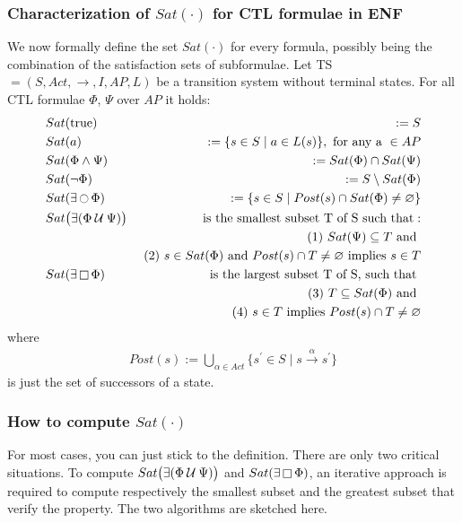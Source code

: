 \documentclass{article}
\begin{document}
\subsubsection*{Characterization of $Sat(\cdot)$ for CTL formulae in ENF}
We now formally define the set $Sat(\cdot)$ for every formula, 
possibly being the combination of the satisfaction sets of subformulae. 
Let TS $ = (S, Act, \rightarrow, I, AP, L)$ be a transition system without terminal states. 
For all CTL formulae $\Phi$, $\Psi$ over $AP$ it holds:
\begin{eqnarray*}
    & Sat(\text{true})          & := S \\
    & Sat(a)                    & := \{ s \in S \mid a \in L(s) \}, \text{ for any a } \in AP \\ 
    & Sat( \Phi \land \Psi)     & := Sat(\Phi) \cap Sat(\Psi) \\ 
    & Sat(\neg \Phi)            & := S \setminus Sat(\Phi) \\ 
    & Sat(\exists \mathop{\ocircle}{\Phi}) & := \{ s \in S \mid Post(s) \cap Sat(\Phi) \neq \varnothing \}\\
    & Sat\big(\exists (\Phi \mathbin{\mathcal{U}} \Psi) \big) & \text{ is the smallest subset T of S such that}: \\
    && \text{ (1) } Sat(\Psi) \subseteq T \text{ and } \\
    && \text{ (2) } s \in Sat(\Phi) \text{ and } Post(s) \cap T \neq \varnothing \text{ implies } s \in T \\
    & Sat(\exists \mathop{\square} \Phi) & \text{is the largest subset T of S, such that }\\
    && \text{ (3) } T \subseteq Sat(\Phi) \text{ and } \\
    && \text{ (4) } s \in T \text{ implies } Post(s) \cap T \neq \varnothing \\
\end{eqnarray*}
where
\begin{align*}
    Post(s) := \bigcup_{\alpha \in Act} \{ s^{'} \in S \mid s \xrightarrow{\alpha} s^{'} \}
\end{align*}
is just the set of successors of a state.

\subsubsection{How to compute $Sat(\cdot)$}
For most cases, you can just stick to the definition. There are only two critical situations.
To compute $Sat\big(\exists (\Phi \mathbin{\mathcal{U}} \Psi) \big)$ and $Sat(\exists \mathop{\square} \Phi)$, an iterative approach is required to compute respectively the smallest subset and the greatest subset that verify the property. The two algorithms are sketched here.
\end{document}
